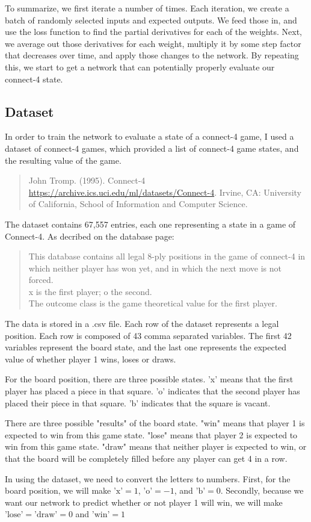 \documentclass[10pt]{article}
\begin{document}
To summarize, we first iterate a number of times. Each iteration, we create a batch of randomly selected inputs and expected outputs. We feed those in, and use the loss function to find the partial derivatives for each of the weights. Next, we average out those derivatives for each weight, multiply it by some step factor that decreases over time, and apply those changes to the network. By repeating this, we start to get a network that can potentially properly evaluate our connect-4 state.

\subsection{Dataset}

In order to train the network to evaluate a state of a connect-4 game, I used a dataset of connect-4 games, which provided a list of connect-4 game states, and the resulting value of the game.
\begin{quote}
    John Tromp. (1995). Connect-4 \url{https://archive.ics.uci.edu/ml/datasets/Connect-4}. Irvine, CA: University of California, School of Information and Computer Science.
\end{quote}
The dataset contains 67,557 entries, each one representing a state in a game of Connect-4. As decribed on the database page:
\begin{quote}
    This database contains all legal 8-ply positions in the game of connect-4 in which neither player has won yet, and in which the next move is not forced.\\
x is the first player; o the second.\\
The outcome class is the game theoretical value for the first player.
\end{quote}
The data is stored in a .csv file. Each row of the dataset represents a legal position. Each row is composed of 43 comma separated variables. The first 42 variables represent the board state, and the last one represents the expected value of whether player 1 wins, loses or draws.\par
For the board position, there are three possible states. 'x' means that the first player has placed a piece in that square. 'o' indicates that the second player has placed their piece in that square. 'b' indicates that the square is vacant.\par
There are three possible "results" of the board state. "win" means that player 1 is expected to win from this game state. "lose" means that player 2 is expected to win from this game state. "draw" means that neither player is expected to win, or that the board will be completely filled before any player can get 4 in a row.\par
In using the dataset, we need to convert the letters to numbers. First, for the board position, we will make $\text{'x'} = 1$, $\text{'o'} = -1$, and $\text{'b'} = 0$. Secondly, because we want our network to predict whether or not player 1 will win, we will make $\text{'lose'} = \text{'draw'} = 0$ and $\text{'win'} = 1$
\end{document}
